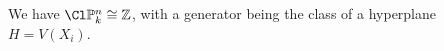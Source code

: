 We have $\Cl \mathbb{P}_k^n \cong \mathbb{Z}$, with a generator being the class of a hyperplane
$H = V(X_i)$.
